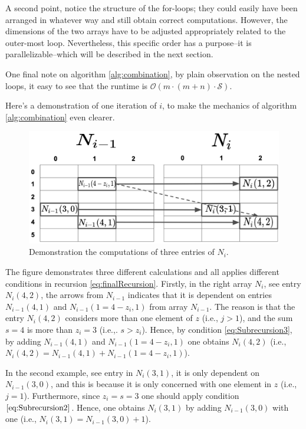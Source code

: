 \documentclass[a4paper]{article}
\begin{document}
A second point, notice the structure of the for-loops; they could easily have been arranged in whatever way and still obtain correct computations. However, the dimensions of the two arrays have to be adjusted appropriately related to the outer-most loop. Nevertheless, this specific order has a purpose–it is parallelizable–which will be described in the next section.

One final note on algorithm \ref{alg:combination}, by plain observation on the nested loops, it easy to see that the runtime is $\mathcal{O}(m\cdot (m+n)\cdot \mathcal{S})$.

Here's a demonstration of one iteration of $i$, to make the mechanics of algorithm \ref{alg:combination} even clearer.

\begin{figure}[H]
\centering
\includegraphics[height=0.45\textwidth]{exampleparallelized.png}
\caption{Demonstration the computations of three entries of $N_{i}$.}\label{normal_calibration.png}
\end{figure}

The figure demonstrates three different calculations and all applies different conditions in recursion \ref{eq:finalRecursion}. Firstly, in the right array $N_{i}$, see entry $N_{i}(4,2)$, the arrows from $N_{i-1}$ indicates that it is dependent on entries $N_{i-1}(4,1)$ and $N_{i-1}(1=4-z_{i},1)$ from array $N_{i-1}$. The reason is that the entry $N_{i}(4,2)$ considers more than one element of $z$ (i.e., $j>1$), and the sum $s=4$ is more than $z_{i}=3$ (i.e.,. $s>z_{i}$). Hence, by condition \ref{eq:Subrecursion3}, by adding $N_{i-1}(4,1)$ and $N_{i-1}(1=4-z_{i},1)$ one obtains $N_{i}(4,2)$ (i.e., $N_{i}(4,2)=N_{i-1}(4,1) +N_{i-1}(1=4-z_{i},1)$). 

In the second example, see entry  in $N_{i}(3,1)$, it is only dependent on $N_{i-1}(3,0)$, and this is because it is only concerned with one element in $z$ (i.e., $j=1$). Furthermore, since $z_{i}=s=3$ one should apply condition $\ref{eq:Subrecursion2}$. Hence, one obtains $N_{i}(3,1)$ by adding $N_{i-1}(3,0)$ with one (i.e., $N_{i}(3,1)=N_{i-1}(3,0)+1$). 
\end{document}
